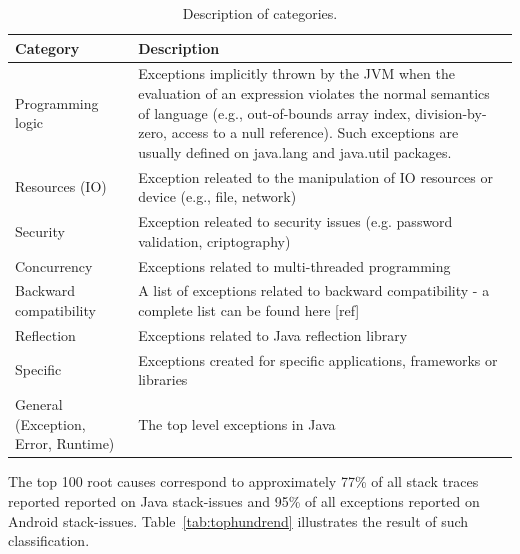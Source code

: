 \documentclass[conference]{IEEEtran}
\begin{document}
\begin{table}
  \centering
  \begin{tabular}{|p{2cm}| p{5cm}|}
    \hline
    \bfseries{Category} & \bfseries{Description} \\
    \hline
      Programming logic &  Exceptions implicitly  thrown by the JVM when the 
evaluation of an expression violates the normal semantics of language (e.g., 
out-of-bounds array index, division-by-zero, access to a null reference). 
Such exceptions are usually defined on java.lang and java.util packages. \\ \hline
      Resources (IO)                         & Exception releated to the manipulation of IO resources or device  (e.g., file, network) \\ \hline
      Security                               & Exception releated to security issues (e.g. password validation, criptography) \\ \hline
      Concurrency                            & Exceptions related to multi-threaded programming \\ \hline
      Backward compatibility                 &  A list of exceptions related to backward compatibility - a complete list can be found here [ref]  \\ \hline
      Reflection                             & Exceptions related to Java reflection library  \\ \hline
      Specific                & Exceptions created for specific applications, frameworks or libraries \\ \hline
      General (Exception, Error, Runtime)    & The top level exceptions in Java    \\ \hline
    \hline
  \end{tabular}
  \caption{Description of categories.}
  \label{tab:categories}
\end{table}

The top 100 root causes correspond to approximately 77\% of all stack traces
reported reported on Java stack-issues and 95\% of all exceptions reported on
Android stack-issues. Table~\ref{tab:tophundrend} illustrates the result of such 
classification.
\end{document}

